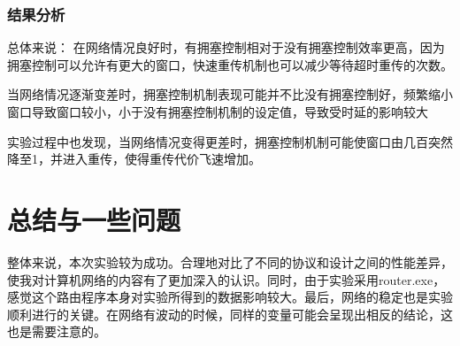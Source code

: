 \documentclass[UTF8,a4paper,10pt]{ctexart}
\begin{document}
\subsubsection{结果分析}
总体来说：
在网络情况良好时，有拥塞控制相对于没有拥塞控制效率更高，因为拥塞控制可以允许有更大的窗口，快速重传机制也可以减少等待超时重传的次数。\par
当网络情况逐渐变差时，拥塞控制机制表现可能并不比没有拥塞控制好，频繁缩小窗口导致窗口较小，小于没有拥塞控制机制的设定值，导致受时延的影响较大\par
实验过程中也发现，当网络情况变得更差时，拥塞控制机制可能使窗口由几百突然降至1，并进入重传，使得重传代价飞速增加。
\section{总结与一些问题}
整体来说，本次实验较为成功。合理地对比了不同的协议和设计之间的性能差异，使我对计算机网络的内容有了更加深入的认识。同时，由于实验采用router.exe，感觉这个路由程序本身对实验所得到的数据影响较大。最后，网络的稳定也是实验顺利进行的关键。在网络有波动的时候，同样的变量可能会呈现出相反的结论，这也是需要注意的。
\end{document}
